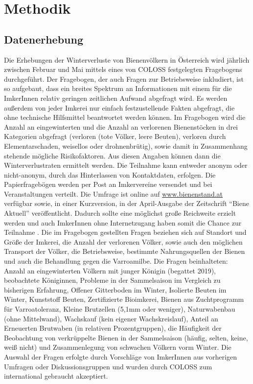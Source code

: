 \section{Methodik}

\subsection{Datenerhebung}

Die Erhebungen der Winterverluste von Bienenvölkern in Österreich wird jährlich zwischen Februar und Mai mittels eines von COLOSS festgelegten Fragebogens durchgeführt. Der Fragebogen, der auch Fragen zur Betriebsweise inkludiert, ist so aufgebaut, dass ein breites Spektrum an Informationen mit einem für die ImkerInnen relativ geringen zeitlichen Aufwand abgefragt wird. Es werden außerdem von jeder Imkerei nur einfach festzustellende Fakten abgefragt, die ohne technische Hilfsmittel beantwortet werden können. Im Fragebogen wird die Anzahl an eingewinterten und die Anzahl an verlorenen Bienenstöcken in drei Kategorien abgefragt (verloren (tote Völker, leere Beuten), verloren durch Elementarschaden, weisellos oder drohnenbrütig), sowie damit in Zusammenhang stehende mögliche Risikofaktoren. Aus diesen Angaben können dann die  Winterverlustraten ermittelt werden.
\newline
Die Teilnahme kann entweder anonym oder nicht-anonym, durch das Hinterlassen von Kontaktdaten, erfolgen. Die Papierfragebögen werden per Post an Imkervereine versendet und bei Veranstaltungen verteilt. Die Umfrage ist online auf \url{www.bienenstand.at} verfügbar sowie, in einer Kurzversion, in der April-Ausgabe der Zeitschrift \enquote{Biene Aktuell} veröffentlicht. Dadurch sollte eine möglichst große Reichweite erzielt werden und auch ImkerInnen ohne Internetzugang haben somit die Chance zur Teilnahme \citep{vanderzee2013}.
\newline
Die im Fragebogen gestellten Fragen beziehen sich auf Standort und Größe der Imkerei, die Anzahl der verlorenen Völker, sowie auch den möglichen Transport der Völker, die Betriebsweise, bestimmte Nahrungsquellen der Bienen und auch die Behandlung gegen die Varroamilbe. Die Fragen beinhalteten: Anzahl an eingewinterten Völkern mit junger Königin (begattet 2019), beobachtete Königinnen, Probleme in der Sammelsaison im Vergleich zu bisherigen Erfahrung, Offener Gitterboden im Winter, Isolierte Beuten im Winter, Kunststoff Beuten, Zertifizierte Bioimkerei, Bienen aus Zuchtprogramm für Varroatoleranz, Kleine Brutzellen (5,1mm oder weniger), Naturwabenbau (ohne Mittelwand), Wachskauf (kein eigener Wachskreislauf), Anteil an Erneuerten Brutwaben (in relativen Prozentgruppen), die Häufigkeit der Beobachtung von verkrüppelte Bienen in der Sammelsaison (häufig, selten, keine, weiß nicht) und Zusammenlegung von schwachen Völkern vorm Winter. Die Auswahl der Fragen erfolgte durch Vorschläge von ImkerInnen aus vorherigen Umfragen oder Diskussionsgruppen und wurden durch COLOSS zum international gebraucht akzeptiert.
